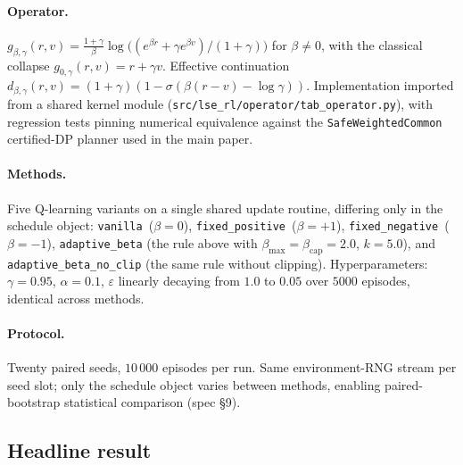 \paragraph{Operator.}  $g_{\beta,\gamma}(r,v) =
\frac{1+\gamma}{\beta}\log\!\bigl((e^{\beta r}+\gamma e^{\beta v})/(1+\gamma)\bigr)$
for $\beta\ne0$, with the classical collapse $g_{0,\gamma}(r,v)=r+\gamma v$.
Effective continuation $d_{\beta,\gamma}(r,v)=(1+\gamma)(1-\sigma(\beta(r-v)-\log\gamma))$.
Implementation imported from a shared kernel module (\texttt{src/lse\_rl/operator/tab\_operator.py}),
with regression tests pinning numerical equivalence against the
\texttt{SafeWeightedCommon} certified-DP planner used in the main paper.

\paragraph{Methods.}  Five Q-learning variants on a single shared update
routine, differing only in the schedule object: \texttt{vanilla}~($\beta=0$),
\texttt{fixed\_positive}~($\beta=+1$), \texttt{fixed\_negative}~($\beta=-1$),
\texttt{adaptive\_beta} (the rule above with $\beta_{\max}=\beta_{\mathrm{cap}}=2.0$,
$k=5.0$), and \texttt{adaptive\_beta\_no\_clip} (the same rule without
clipping).  Hyperparameters: $\gamma=0.95$, $\alpha=0.1$, $\varepsilon$
linearly decaying from $1.0$ to $0.05$ over $5000$ episodes, identical
across methods.

\paragraph{Protocol.}  Twenty paired seeds, $10\,000$ episodes per run.
Same environment-RNG stream per seed slot; only the schedule object
varies between methods, enabling paired-bootstrap statistical comparison
(spec §9).

\subsection{Headline result}

